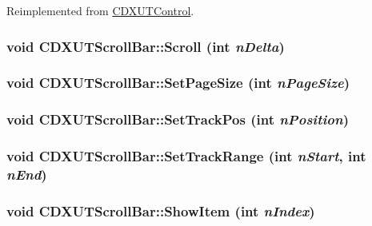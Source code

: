 Reimplemented from \hyperlink{class_c_d_x_u_t_control_afd92fa04241f66fdbf207bc5870c9388}{CDXUTControl}.\hypertarget{class_c_d_x_u_t_scroll_bar_ae0f76bd7f88a7f26fce6b6026c686245}{
\subsubsection[{Scroll}]{\setlength{\rightskip}{0pt plus 5cm}void CDXUTScrollBar::Scroll ({\bf int} {\em nDelta})}}
\label{class_c_d_x_u_t_scroll_bar_ae0f76bd7f88a7f26fce6b6026c686245}
\hypertarget{class_c_d_x_u_t_scroll_bar_ad59e8080c3af65a712c725d8cb4f1a10}{
\subsubsection[{SetPageSize}]{\setlength{\rightskip}{0pt plus 5cm}void CDXUTScrollBar::SetPageSize ({\bf int} {\em nPageSize})}}
\label{class_c_d_x_u_t_scroll_bar_ad59e8080c3af65a712c725d8cb4f1a10}
\hypertarget{class_c_d_x_u_t_scroll_bar_af38e14cfcc0d51d1c3238b3ed1d21553}{
\subsubsection[{SetTrackPos}]{\setlength{\rightskip}{0pt plus 5cm}void CDXUTScrollBar::SetTrackPos ({\bf int} {\em nPosition})}}
\label{class_c_d_x_u_t_scroll_bar_af38e14cfcc0d51d1c3238b3ed1d21553}
\hypertarget{class_c_d_x_u_t_scroll_bar_ae8eb89fb79562550d1c481ba5f268522}{
\subsubsection[{SetTrackRange}]{\setlength{\rightskip}{0pt plus 5cm}void CDXUTScrollBar::SetTrackRange ({\bf int} {\em nStart}, \/  {\bf int} {\em nEnd})}}
\label{class_c_d_x_u_t_scroll_bar_ae8eb89fb79562550d1c481ba5f268522}
\hypertarget{class_c_d_x_u_t_scroll_bar_ae7cbe7407c725caf9f57ee95a3e633ca}{
\subsubsection[{ShowItem}]{\setlength{\rightskip}{0pt plus 5cm}void CDXUTScrollBar::ShowItem ({\bf int} {\em nIndex})}}
